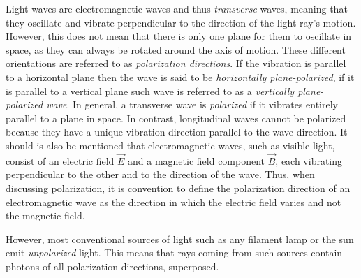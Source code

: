 
Light waves are electromagnetic waves and thus \emph{transverse} waves, meaning that they oscillate and vibrate perpendicular to the direction of the light ray's motion. However, this does not mean that there is only one plane for them to oscillate in space, as they can always be rotated around the axis of motion. These different orientations are referred to as \emph{polarization directions}. If the vibration is parallel to a horizontal plane then the wave is said to be \emph{horizontally plane-polarized}, if it is parallel to a vertical plane such wave is referred to as a \emph{vertically plane-polarized wave}. In general, a transverse wave is \emph{polarized} if it vibrates entirely parallel to a plane in space. In contrast, longitudinal waves cannot be polarized because they have a unique vibration direction parallel to the wave direction. It should is also be mentioned that electromagnetic waves, such as visible light, consist of an electric field $\vec{E}$ and a magnetic field component $\vec{B}$, each vibrating perpendicular to the other and to the direction of the wave. Thus, when discussing polarization, it is convention to define the polarization direction of an electromagnetic wave as the direction in which the electric field varies and not the magnetic field. 

However, most conventional sources of light such as any filament lamp or the sun emit \emph{unpolarized} light. This means that rays coming from such sources contain photons of all polarization directions, superposed.

\begin{figure}[h!]
	\centering
	\hspace{2cm}
\end{figure}

